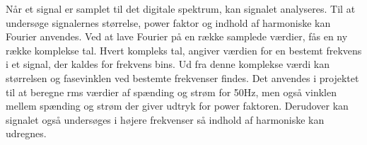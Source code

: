 Når et signal er samplet til det digitale spektrum, kan signalet analyseres. Til at undersøge signalernes størrelse, power faktor og indhold af harmoniske kan Fourier anvendes. Ved at lave Fourier på en række samplede værdier, fås en ny række komplekse tal. Hvert kompleks tal, angiver værdien for en bestemt frekvens i et signal, der kaldes for frekvens bins. Ud fra denne komplekse værdi kan størrelsen og fasevinklen ved bestemte frekvenser findes. Det anvendes i projektet til at beregne rms værdier af spænding og strøm for 50Hz, men også vinklen mellem spænding og strøm der giver udtryk for power faktoren. Derudover kan signalet også undersøges i højere frekvenser så indhold af harmoniske kan udregnes.  

